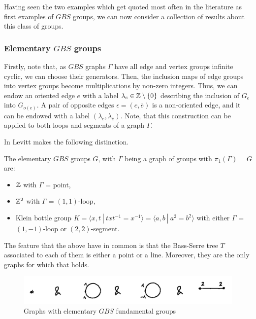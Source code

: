 Having seen the two examples which get quoted most often in the literature as first examples of $GBS$ groups, we can now consider a collection of results about this class of groups.

\subsubsection{Elementary $GBS$ groups} \label{labelledGBSgraph}
Firstly, note that, as $GBS$ graphs $\Gamma$ have all edge and vertex groups infinite cyclic, we can choose their generators. Then, the inclusion maps of edge groups into vertex groups become multiplications by non-zero integers. Thus, we can endow an oriented edge $e$ with a label $\lambda_e \in \mathbb{Z} \setminus \{0\}$ describing the inclusion of $G_e$ into $G_{o(e)}$. A pair of opposite edges $\epsilon = (e,\overline{e})$ is a non-oriented edge, and it can be endowed with a label $(\lambda_e,\lambda_{\overline{e}})$. Note, that this construction can be applied to both loops and segments of a graph $\Gamma$.

In \cite{Le07} Levitt makes the following distinction.

\begin{remark} \label{elemlinegbs}
    The elementary $GBS$ groups $G$, with $\Gamma$ being a graph of groups with $\pi_1(\Gamma) = G$ are:
    \begin{itemize}
        \item $\mathbb{Z}$ with $\Gamma$ = point,
        \item $\mathbb{Z}^2$ with $\Gamma$ = $(1,1)$-loop,
        \item Klein bottle group $K = \langle x,t \: | \: txt^{-1} = x^{-1} \rangle = \langle a,b \: | \: a^2 = b^2\rangle$ with either $\Gamma$ = $(1,-1)$-loop or $(2,2)$-segment.
    \end{itemize}
    The feature that the above have in common is that the Bass-Serre tree $T$ associated to each of them is either a point or a line. Moreover, they are the only graphs for which that holds.
\end{remark}

\begin{figure}[h]
    \centering
    \includegraphics[scale = 0.15]{sections/alicja/Elementary graphs.jpeg}
    \caption{Graphs with elementary $GBS$ fundamental groups}
    \label{elementarygraphs}
\end{figure}

